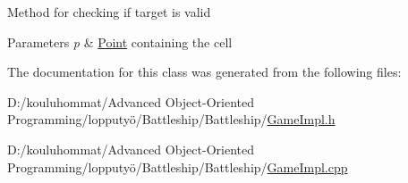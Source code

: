 Method for checking if target is valid 
\begin{DoxyParams}{Parameters}
{\em p} & \mbox{\hyperlink{class_point}{Point}} containing the cell \\
\hline
\end{DoxyParams}


The documentation for this class was generated from the following files\+:\begin{DoxyCompactItemize}
\item 
D\+:/kouluhommat/\+Advanced Object-\/\+Oriented Programming/lopputyö/\+Battleship/\+Battleship/\mbox{\hyperlink{_game_impl_8h}{Game\+Impl.\+h}}\item 
D\+:/kouluhommat/\+Advanced Object-\/\+Oriented Programming/lopputyö/\+Battleship/\+Battleship/\mbox{\hyperlink{_game_impl_8cpp}{Game\+Impl.\+cpp}}\end{DoxyCompactItemize}
